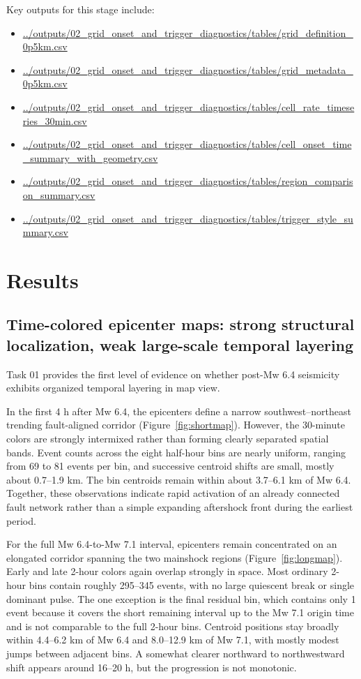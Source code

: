 \documentclass[11pt]{article}
\begin{document}
Key outputs for this stage include:
\begin{itemize}[leftmargin=1.5em]
    \item \url{../outputs/02_grid_onset_and_trigger_diagnostics/tables/grid_definition_0p5km.csv}
    \item \url{../outputs/02_grid_onset_and_trigger_diagnostics/tables/grid_metadata_0p5km.csv}
    \item \url{../outputs/02_grid_onset_and_trigger_diagnostics/tables/cell_rate_timeseries_30min.csv}
    \item \url{../outputs/02_grid_onset_and_trigger_diagnostics/tables/cell_onset_time_summary_with_geometry.csv}
    \item \url{../outputs/02_grid_onset_and_trigger_diagnostics/tables/region_comparison_summary.csv}
    \item \url{../outputs/02_grid_onset_and_trigger_diagnostics/tables/trigger_style_summary.csv}
\end{itemize}

\section{Results}
\subsection{Time-colored epicenter maps: strong structural localization, weak large-scale temporal layering}
Task 01 provides the first level of evidence on whether post-Mw 6.4 seismicity exhibits organized temporal layering in map view.

In the first 4 h after Mw 6.4, the epicenters define a narrow southwest--northeast trending fault-aligned corridor (Figure~\ref{fig:shortmap}). However, the 30-minute colors are strongly intermixed rather than forming clearly separated spatial bands. Event counts across the eight half-hour bins are nearly uniform, ranging from 69 to 81 events per bin, and successive centroid shifts are small, mostly about 0.7--1.9 km. The bin centroids remain within about 3.7--6.1 km of Mw 6.4. Together, these observations indicate rapid activation of an already connected fault network rather than a simple expanding aftershock front during the earliest period.

For the full Mw 6.4-to-Mw 7.1 interval, epicenters remain concentrated on an elongated corridor spanning the two mainshock regions (Figure~\ref{fig:longmap}). Early and late 2-hour colors again overlap strongly in space. Most ordinary 2-hour bins contain roughly 295--345 events, with no large quiescent break or single dominant pulse. The one exception is the final residual bin, which contains only 1 event because it covers the short remaining interval up to the Mw 7.1 origin time and is not comparable to the full 2-hour bins. Centroid positions stay broadly within 4.4--6.2 km of Mw 6.4 and 8.0--12.9 km of Mw 7.1, with mostly modest jumps between adjacent bins. A somewhat clearer northward to northwestward shift appears around 16--20 h, but the progression is not monotonic.
\end{document}
